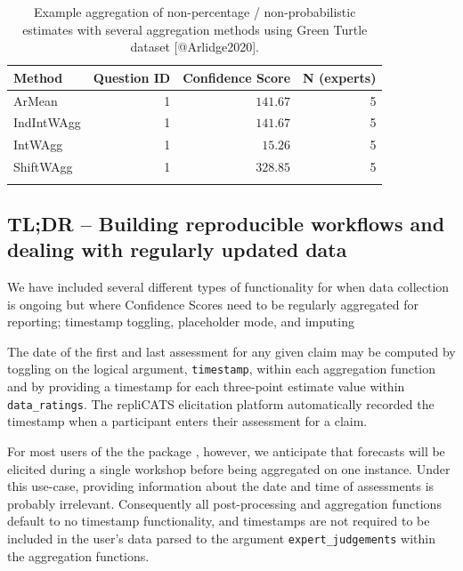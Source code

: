 \documentclass[article]{jss}
\begin{document}
\hypertarget{tbl-BYO-data-aggregate}{}
\begin{longtable}{lrrr}

\toprule
Method & Question ID & Confidence Score & N (experts) \\ 
\midrule
ArMean & 1 & $141.67$ & 5 \\ 
IndIntWAgg & 1 & $141.67$ & 5 \\ 
IntWAgg & 1 & $15.26$ & 5 \\ 
ShiftWAgg & 1 & $328.85$ & 5 \\ 
\bottomrule
\caption{\label{tbl-BYO-data-aggregate}Example aggregation of non-percentage / non-probabilistic estimates with
several aggregation methods using Green Turtle dataset
{[}@Arlidge2020{]}. }\tabularnewline
\end{longtable}

\hypertarget{tldr-building-reproducible-workflows-and-dealing-with-regularly-updated-data}{%
\subsection{TL;DR -- Building reproducible workflows and dealing with
regularly updated
data}\label{tldr-building-reproducible-workflows-and-dealing-with-regularly-updated-data}}

We have included several different types of functionality for when data
collection is ongoing but where Confidence Scores need to be regularly
aggregated for reporting; timestamp toggling, placeholder mode, and
imputing

The date of the first and last assessment for any given claim may be
computed by toggling on the logical argument, \texttt{timestamp}, within
each aggregation function and by providing a timestamp for each
three-point estimate value within \texttt{data\_ratings}. The repliCATS
elicitation platform automatically recorded the timestamp when a
participant enters their assessment for a claim.

For most users of the the  package , however, we
anticipate that forecasts will be elicited during a single workshop
before being aggregated on one instance. Under this use-case, providing
information about the date and time of assessments is probably
irrelevant. Consequently all post-processing and aggregation functions
default to no timestamp functionality, and timestamps are not required
to be included in the user's data parsed to the argument
\texttt{expert\_judgements} within the aggregation functions.
\end{document}

